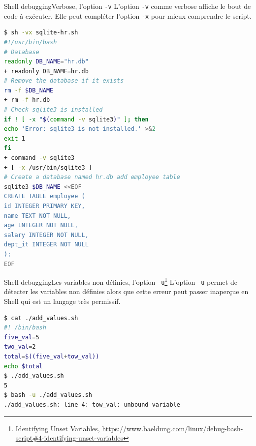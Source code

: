 \documentclass{beamer}
\begin{document}
    \begin{frame}[fragile]{Shell debugging}{Verbose, l'option \lstinline{-v}}
        L'option \lstinline{-v} comme verbose affiche le bout de code à exécuter.
        Elle peut compléter l'option \lstinline{-x} pour mieux comprendre le script.
        \bigbreak
        \begin{lstlisting}[language=bash,basicstyle=\tiny\ttfamily]
$ sh -vx sqlite-hr.sh
#!/usr/bin/bash
# Database
readonly DB_NAME="hr.db"
+ readonly DB_NAME=hr.db
# Remove the database if it exists
rm -f $DB_NAME
+ rm -f hr.db
# Check sqlite3 is installed
if ! [ -x "$(command -v sqlite3)" ]; then
echo 'Error: sqlite3 is not installed.' >&2
exit 1
fi
+ command -v sqlite3
+ [ -x /usr/bin/sqlite3 ]
# Create a database named hr.db add employee table
sqlite3 $DB_NAME <<EOF
CREATE TABLE employee (
id INTEGER PRIMARY KEY,
name TEXT NOT NULL,
age INTEGER NOT NULL,
salary INTEGER NOT NULL,
dept_it INTEGER NOT NULL
);
EOF
        \end{lstlisting}
    \end{frame}

    \begin{frame}[fragile]{Shell debugging}{Les variables non définies, l'option \lstinline{-u}\footnote{\label{baeldung-shell}Identifying Unset Variables, \url{https://www.baeldung.com/linux/debug-bash-script\#4-identifying-unset-variables}}}
        L'option \lstinline{-u} permet de détecter les variables non définies alors que cette erreur peut passer inaperçue en Shell qui est un langage très permissif.
        \bigbreak
        \begin{lstlisting}[language=bash]
$ cat ./add_values.sh
#! /bin/bash
five_val=5
two_val=2
total=$((five_val+tow_val))
echo $total
$ ./add_values.sh
5
$ bash -u ./add_values.sh
./add_values.sh: line 4: tow_val: unbound variable
        \end{lstlisting}
    \end{frame}
\end{document}
